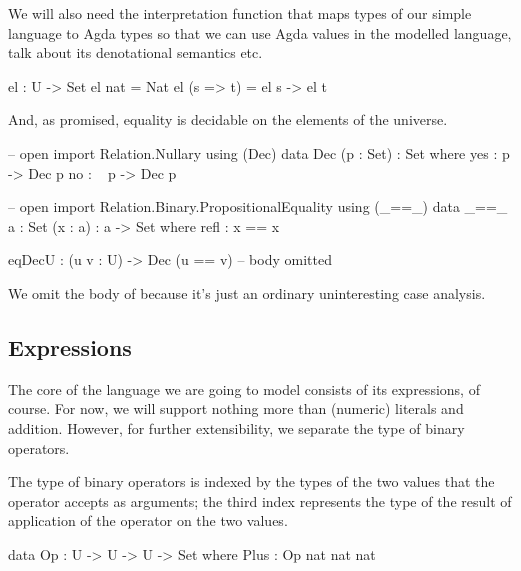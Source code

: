 \noindent We will also need the interpretation function  that maps
types of our simple language to Agda types so that we can use Agda values in
the modelled language, talk about its denotational semantics etc.

\begin{code}
  el : U -> Set
  el nat = Nat
  el (s => t) = el s -> el t
\end{code}

\noindent And, as promised, equality is decidable on the elements of the
universe.

\begin{code}
  -- open import Relation.Nullary using (Dec)
  data Dec (p : Set) : Set where
    yes : p -> Dec p
    no  : ~ p -> Dec p

  -- open import Relation.Binary.PropositionalEquality using (_==\_)
  data _==\_ {a : Set} (x : a) : a -> Set where
    refl : x == x

  eqDecU : (u v : U) -> Dec (u == v)
  -- body omitted
\end{code}

\noindent We omit the body of  because it's just an ordinary
uninteresting case analysis.


\subsection{Expressions}

The core of the language we are going to model consists of its expressions, of
course. For now, we will support nothing more than (numeric) literals and addition.
However, for further extensibility, we separate the type of binary operators.

The type of binary operators is indexed by the types of the two values that
the operator accepts as arguments; the third index represents the type of
the result of application of the operator on the two values.

\begin{code}
  data Op : U -> U -> U -> Set where
    Plus : Op nat nat nat
\end{code}


